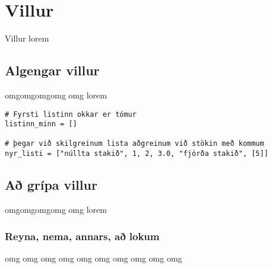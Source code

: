 
\chapter{Villur}\label{k:villur}
Villur lorem

\section{Algengar villur}\label{uk:villur-algengar}
omgomgomgomg omg lorem

\begin{lstlisting}[caption=Nokkrar algengar villur, label=lst:villur-kynntar]
# Fyrsti listinn okkar er tómur
listinn_minn = []

# þegar við skilgreinum lista aðgreinum við stökin með kommum
nyr_listi = ["núllta stakið", 1, 2, 3.0, "fjórða stakið", [5]]
\end{lstlisting}

\section{Að grípa villur}\label{uk:villur-grípa}
omgomgomgomg omg lorem

\subsection{Reyna, nema, annars, að lokum}\label{uk:villur-try}
omg omg omg omg omg omg omg omg omg omg
